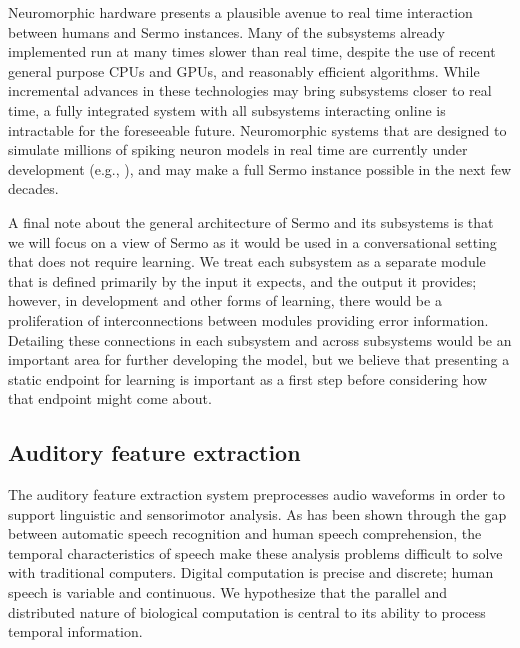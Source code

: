 Neuromorphic hardware
presents a plausible avenue
to real time interaction
between humans and Sermo instances.
Many of the subsystems already implemented
run at many times slower than real time,
despite the use of recent general purpose
CPUs and GPUs,
and reasonably efficient algorithms.
While incremental advances
in these technologies may
bring subsystems closer to real time,
a fully integrated system
with all subsystems interacting online
is intractable for the foreseeable future.
Neuromorphic systems that are designed
to simulate millions of spiking neuron models
in real time
are currently under development
(e.g., \cite{furber2013,benjamin2014}),
and may make a full Sermo instance
possible in the next few decades.

A final note about
the general architecture of Sermo
and its subsystems
is that we will focus on a view
of Sermo as it would be used
in a conversational setting
that does not require learning.
We treat each subsystem as a separate
module that is defined primarily
by the input it expects,
and the output it provides;
however, in development and other forms
of learning,
there would be a proliferation of
interconnections between modules
providing error information.
Detailing these connections
in each subsystem and across subsystems
would be an important area
for further developing the model,
but we believe that presenting
a static endpoint for learning
is important as a first step
before considering
how that endpoint might come about.

\subsection{Auditory feature extraction}
\label{sec:model-ncc}


The auditory feature extraction system
preprocesses audio waveforms
in order to support
linguistic and sensorimotor analysis.
As has been shown through
the gap between
automatic speech recognition
and human speech comprehension,
the temporal characteristics
of speech
make these analysis problems
difficult to solve
with traditional computers.
Digital computation is precise and discrete;
human speech is variable and continuous.
We hypothesize that the
parallel and distributed nature
of biological computation
is central to its
ability to process temporal information.

